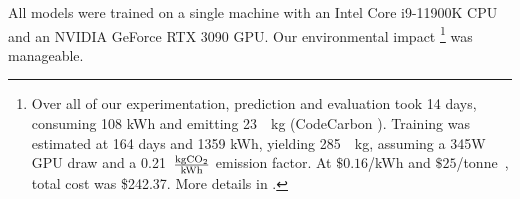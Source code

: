 All models were trained on a single machine with an Intel Core i9-11900K CPU and an NVIDIA GeForce RTX 3090 GPU. 
Our environmental impact
\footnote{Over all of our experimentation, prediction and evaluation took 14 days, consuming 108 kWh and emitting 23~\cotwo~kg (CodeCarbon \cite{lacoste2019codecarbon}). Training was estimated at 164 days and 1359 kWh, yielding 285~\cotwo~kg, assuming a 345W GPU draw and a 0.21~$\frac{\textrm{kg}\mathrm{CO_2}{}}{\textrm{kWh}}$ emission factor. At $\$0.16$/kWh and $\$25$/tonne~\cotwo, total cost was \$242.37. More details in .}
was manageable.

